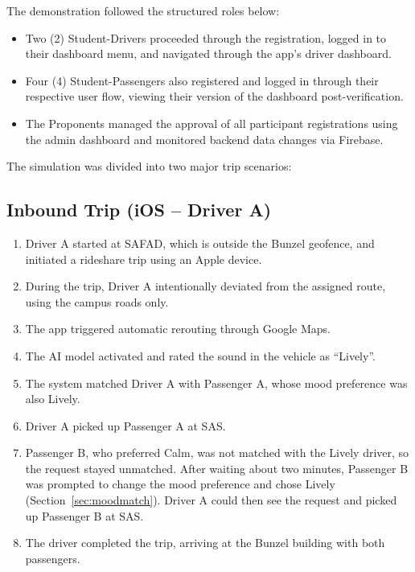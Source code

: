 \indent The demonstration followed the structured roles below:
\begin{itemize}
    \item Two (2) Student-Drivers proceeded through the registration, logged in to their dashboard menu, and navigated through the app’s driver dashboard.
    \item Four (4) Student-Passengers also registered and logged in through their respective user flow, viewing their version of the dashboard post-verification.
    \item The Proponents managed the approval of all participant registrations using the admin dashboard and monitored backend data changes via Firebase.
\end{itemize}

\vspace{1em}
\indent The simulation was divided into two major trip scenarios:

\subsection[Inbound Trip (iOS -- Driver A)]{Inbound Trip (iOS -- Driver A)}
\vspace{1em}
    \begin{enumerate}
        \item Driver A started at SAFAD, which is outside the Bunzel geofence, and initiated a rideshare trip using an Apple device.
        \item During the trip, Driver A intentionally deviated from the assigned route, using the campus roads only.
        \item The app triggered automatic rerouting through Google Maps.
        \item The AI model activated and rated the sound in the vehicle as ``Lively''.
        \item The system matched Driver A with Passenger A, whose mood preference was also Lively.
        \item Driver A picked up Passenger A at SAS.
        \item Passenger B, who preferred Calm, was not matched with the Lively driver, so the request stayed unmatched. After waiting about two minutes, Passenger B was prompted to change the mood preference and chose Lively (Section~\ref{sec:moodmatch}). Driver A could then see the request and picked up Passenger B at SAS.
        \item The driver completed the trip, arriving at the Bunzel building with both passengers.
    \end{enumerate}

